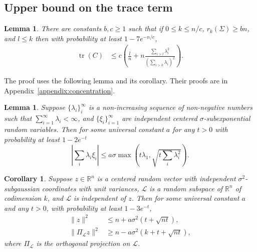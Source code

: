 \documentclass[11pt,notitlepage]{article}
\newcommand\Ls {\mathscr{L}}
\newcommand\R {\mathbb{R}}
\renewcommand\Re{\R}
\newcommand\tr {\ensuremath{\operatorname{\mathrm{tr}}}}
\newtheorem{lemma}[theorem]{Lemma}
\newtheorem{cor}[theorem]{Corollary}
\begin{document}
\subsection*{Upper bound on the trace term}

\begin{lemma}\label{lemma:traceupper}
  There are constants $b,c\ge 1$ such that 
  if $0\le k\le n/c$, $r_k(\Sigma)\ge bn$, and $l\le k$ 
then  with probability at least 
$1 - 7e^{-n/c}$,
    \begin{align*}
      \tr(C)
        &\le c \left(\frac{l}{n} + n \frac{\sum_{i>l}\lambda_i^2}
            {\left(\sum_{i>k}\lambda_i\right)^2} \right).
    \end{align*}
\end{lemma}
The proof uses the following lemma and its corollary. Their proofs are in
Appendix~\ref{appendix:concentration}.
\begin{lemma}\label{lemma::cor-Bernstein}
  	Suppose $\{\lambda_i\}_{i}^\infty $ is a non-increasing sequence of non-negative numbers such that $\sum_{i=1}^\infty \lambda_i < \infty$, and $\{\xi_i\}_{i = 1}^\infty$ are independent centered $\sigma$-subexponential random variables. Then for some universal constant $a$ for any $t > 0$ with probability at least $1-2e^{-t}$
  	\[
  	\left|\sum_{i} \lambda_i \xi_i\right| \leq a\sigma\max\left(t\lambda_1, \sqrt{t \sum_{i} \lambda_i^2}\right).
  	\]
\end{lemma}
\begin{cor}
	\label{cor::cor norm of projection}
	Suppose $z\in \Re^n$ is a centered random vector with independent
    $\sigma^2$-subgaussian coordinates with unit variances,
    $\Ls$ is a random subspace of $\Re^n$ of codimension
    $k$, and $\Ls$ is independent of $z$. Then for some universal
    constant $a$ and any $t > 0$, with probability at least
    $1-3e^{-t}$,
	\begin{align*}
	\|z\|^2 &\leq n + a\sigma^2(t + \sqrt{nt}),\\
	\|\Pi_{\Ls} z\|^2 &\geq n - a\sigma^2(k + t + \sqrt{nt}),
	\end{align*}
	where $\Pi_{\Ls}$ is the orthogonal projection on $\Ls$.
\end{cor}
\end{document}
